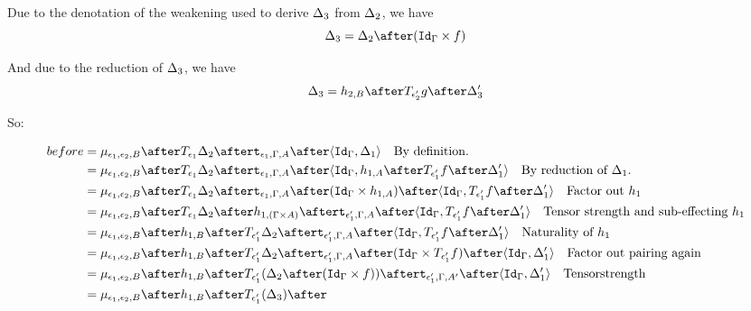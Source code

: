 {                Due to the denotation of the weakening used to derive $\Delta_3$ from $\Delta_2$, we have 
                \begin{equation}
                    \D_3 = \D_2\after(\idg\times f)
                \end{equation}

                And due to the reduction of $\Delta_3$,
                we have 
                \begin{equation}
                    \D_3 = h_{2, B} \after \T{\e_2'}{g}\after \D_3'
                \end{equation}

                So:

                \begin{align}
                    before &= \bind{\e_1}{\e_2}{B}\after \T{\e_1}{\D_2}\after\tstrength{\e_1}{\G}{A}\after\pr{\idg}{\D_1}\qt{By definition.}\\
                    &= \bind{\e_1}{\e_2}{B}\after \T{\e_1}{\D_2}\after\tstrength{\e_1}{\G}{A}\after\pr{\idg}{h_{1, A}\after\T{\e_1'}{f}\after\D_1'}\qt{By reduction of $\D_1$.}\\
                    &= \bind{\e_1}{\e_2}{B}\after \T{\e_1}{\D_2}\after\tstrength{\e_1}{\G}{A}\after(\idg\times h_{1, A})\after\pr{\idg}{\T{\e_1'}{f}\after\D_1'}\qt{Factor out $h_1$}\\
                    &= \bind{\e_1}{\e_2}{B}\after \T{\e_1}{\D_2}\after
                    h_{1, (\G\times A)}\after
                    \tstrength{\e_1'}{\G}{A}\after\pr{\idg}{\T{\e_1'}{f}\after\D_1'}\qt{Tensor strength and sub-effecting $h_1$}\\
                    &= \bind{\e_1}{\e_2}{B}\after 
                    h_{1, B}\after\T{\e_1'}{\D_2}\after
                    \tstrength{\e_1'}{\G}{A}\after\pr{\idg}{\T{\e_1'}{f}\after\D_1'}\qt{Naturality of $h_1$}\\
                    &= \bind{\e_1}{\e_2}{B}\after 
                    h_{1, B}\after\T{\e_1'}{\D_2}\after
                    \tstrength{\e_1'}{\G}{A}\after(\idg\times \T{\e_1'}{f})\after\pr{\idg}{\D_1'}\qt{Factor out pairing again}\\
                    &= \bind{\e_1}{\e_2}{B}\after 
                    h_{1, B}\after\T{\e_1'}{(\D_2\after(\idg\times f))}\after
                    \tstrength{\e_1'}{\G}{A'}\after\pr{\idg}{\D_1'}\qt{Tensorstrength}\\
                    &= \bind{\e_1}{\e_2}{B}\after 
                    h_{1, B}\after\T{\e_1'}{(\D_3)}\after

\end{align}}
